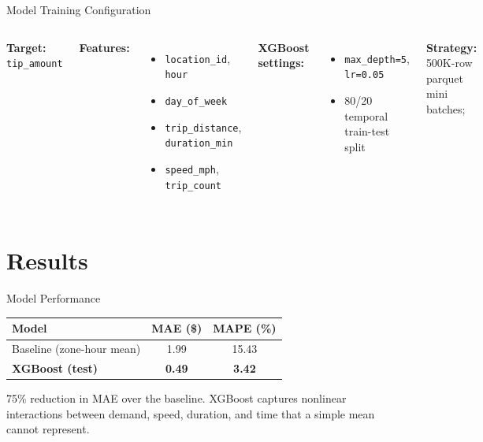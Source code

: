 \documentclass[aspectratio=169,professionalfonts]{beamer}
\begin{document}
\begin{frame}{Model Training Configuration}
\begin{columns}[T]
\textbf{Target:} \texttt{tip\_amount}

\vspace{0.4em}
\textbf{Features:}
\begin{itemize}\small
  \item \texttt{location\_id}, \texttt{hour}
  \item \texttt{day\_of\_week}
  \item \texttt{trip\_distance}, \texttt{duration\_min}
  \item \texttt{speed\_mph}, \texttt{trip\_count}
\end{itemize}

\textbf{XGBoost settings:}\small
\begin{itemize}
  \item \texttt{max\_depth=5}, \texttt{lr=0.05}
  \item 80/20 temporal train-test split
\end{itemize}

\normalsize\vspace{0.4em}
\textbf{Strategy:} 500K-row parquet mini batches;
\end{columns}
\end{frame}

% 
\section{Results}

\begin{frame}{Model Performance}
\Large
\begin{center}
\begin{tabular}{lcc}
\toprule
Model & MAE (\$) & MAPE (\%) \\
\midrule
Baseline (zone-hour mean) & 1.99 & 15.43 \\
\textbf{XGBoost (test)} & \textbf{0.49} & \textbf{3.42} \\
\bottomrule
\end{tabular}
\end{center}

\vspace{0.8em}
\normalsize
\alert{75\% reduction in MAE} over the baseline. XGBoost captures nonlinear
interactions between demand, speed, duration, and time that a simple mean
cannot represent.
\end{frame}
\end{document}
